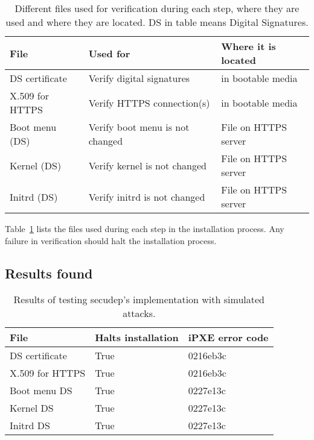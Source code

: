 \begin{table}[!ht]
  \def\arraystretch{1.1}%
  \begin{center}
    \caption{Different files used for verification during each step,
      where they are used and where they are located. DS in table
      means Digital Signatures.\label{tab:verification_files}}
    \begin{tabular}{| l | l | l |}
      \hline
      File            & Used for                        & Where it is located   \\
      \hline
      DS certificate  & Verify digital signatures       & in bootable media    \\
      X.509 for HTTPS & Verify HTTPS connection(s)      & in bootable media    \\
      Boot menu (DS)  & Verify boot menu is not changed & File on HTTPS server \\
      Kernel (DS)     & Verify kernel is not changed    & File on HTTPS server \\
      Initrd (DS)     & Verify initrd is not changed    & File on HTTPS server \\
      \hline
    \end{tabular}
  \end{center}
\end{table}

Table~\ref{tab:verification_files} lists the files used during each
step in the installation process. Any failure in verification should
halt the installation process.


\subsection{Results found}

\begin{table}[!ht]
  \def\arraystretch{1.1}%
  \begin{center}
    \caption{Results of testing secudep's implementation with
      simulated attacks.\label{tab:mechanical_check_results}}
    \begin{tabular}{| l | l | l |}
      \hline
      File            & Halts installation & iPXE error code \\
      \hline
      DS certificate  & True               & 0216eb3c        \\
      X.509 for HTTPS & True               & 0216eb3c        \\
      Boot menu DS    & True               & 0227e13c        \\
      Kernel DS       & True               & 0227e13c        \\
      Initrd DS       & True               & 0227e13c        \\
      \hline
    \end{tabular}
  \end{center}
\end{table}

